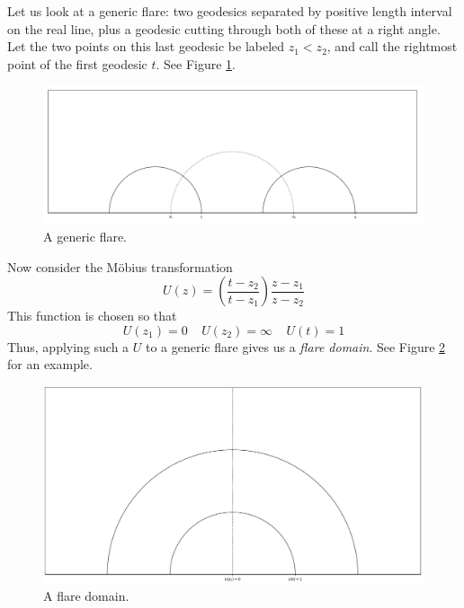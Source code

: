 \documentclass[]{article}
\begin{document}
Let us look at a generic flare: two geodesics separated by positive length interval on the real line, plus a geodesic cutting through both of these at a right angle.
Let the two points on this last geodesic be labeled $z_1 < z_2$, and call the rightmost point of the first geodesic $t$.
See Figure \ref{pre_flare}.
\begin{figure}[h]
	\centering
	\includegraphics[width=\linewidth]{labeled_pre_flare.png}
	\caption{A generic flare.}
	\label{pre_flare}
\end{figure}
Now consider the M\"obius transformation
$$
U(z) = \left( \frac{t - z_2}{t - z_1} \right) \frac{z - z_1}{z - z_2}
$$
This function is chosen so that
$$
U(z_1) = 0 ~~~~~ U(z_2) = \infty ~~~~~ U(t) = 1
$$
Thus, applying such a $U$ to a generic flare gives us a \textit{flare domain}.
See Figure \ref{post_flare} for an example.
\begin{figure}[h]
	\centering
	\includegraphics[width=\linewidth]{labeled_flare.png}
	\caption{A flare domain.}
	\label{post_flare}
\end{figure}
\end{document}
